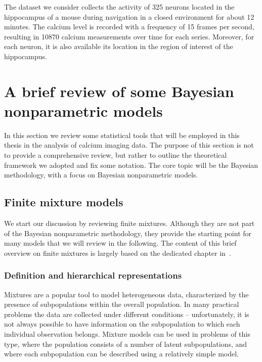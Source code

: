 The dataset we consider collects the activity of 325 neurons located in the hippocampus of a mouse during navigation in a closed environment for about 12 minutes. The calcium level is recorded with a frequency of 15 frames per second, resulting in 10870 calcium measurements over time for each series.
Moreover, for each neuron, it is also available its location in the region of interest of the hippocampus.












\section{A brief review of some Bayesian nonparametric models} 
In this section we review some statistical tools that will be employed in this thesis in the analysis of calcium imaging data. The purpose of this section is not to provide a comprehensive review, but rather to outline the theoretical framework we adopted and fix some notation.
The core topic will be the Bayesian methodology, with a focus on Bayesian nonparametric models.

\subsection{Finite mixture models}
\label{ch1_sec:finite_mix}
We start our discussion by reviewing finite mixtures. Although they are not part of the Bayesian nonparametric methodology, they provide the starting point for many models that we will review in the following. The content of this brief overview on finite mixtures is largely based on the dedicated chapter in~\textcite{gelman2013}.

\subsubsection*{Definition and hierarchical representations}
Mixtures are a popular tool to model heterogeneous data, characterized by the presence of subpopulations within the overall population. In many practical problems the data are collected under different conditions -- unfortunately, it is not always possible to have information on the subpopulation to which each individual observation belongs.
Mixture models can be used in problems of this type, where the population consists of a number of latent subpopulations, and where each subpopulation can be described using a relatively simple model. 

